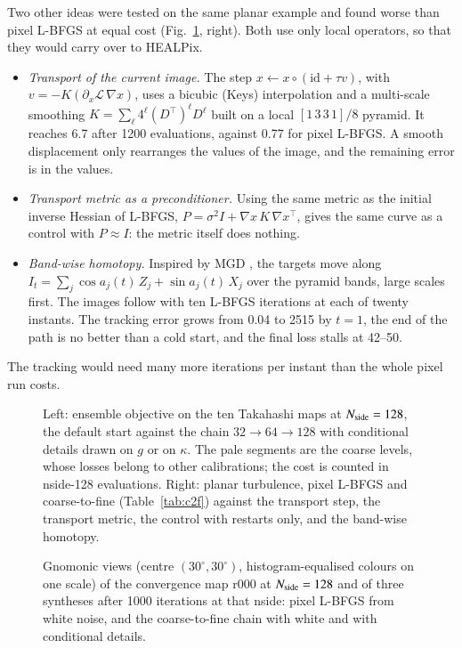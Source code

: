 Two other ideas were tested on the same planar example and found worse than pixel L-BFGS at equal cost (Fig.~\ref{fig:c2f_tests}, right). Both use only local operators, so that they would carry over to HEALPix.
\begin{itemize}
\item \emph{Transport of the current image.} The step $x\leftarrow x\circ(\mathrm{id}+\tau v)$, with $v=-K(\partial_x\mathcal{L}\,\nabla x)$, uses a bicubic (Keys) interpolation and a multi-scale smoothing $K=\sum_\ell 4^\ell (D^\top)^\ell D^\ell$ built on a local $[1\,3\,3\,1]/8$ pyramid. It reaches 6.7 after 1200 evaluations, against 0.77 for pixel L-BFGS. A smooth displacement only rearranges the values of the image, and the remaining error is in the values.
\item \emph{Transport metric as a preconditioner.} Using the same metric as the initial inverse Hessian of L-BFGS, $P=\sigma^2 I+\nabla x\,K\,\nabla x^\top$, gives the same curve as a control with $P\approx I$: the metric itself does nothing.
\item \emph{Band-wise homotopy.} Inspired by MGD \citep{lempereur2026}, the targets move along $I_t=\sum_j \cos a_j(t)\,Z_j+\sin a_j(t)\,X_j$ over the pyramid bands, large scales first. The images follow with ten L-BFGS iterations at each of twenty instants. The tracking error grows from 0.04 to 2515 by $t=1$, the end of the path is no better than a cold start, and the final loss stalls at 42--50.
\end{itemize}
The tracking would need many more iterations per instant than the whole pixel run costs.

\begin{figure}
\centering
{}
\caption{Left: ensemble objective on the ten Takahashi maps at $N_{\rm side}=128$, the default start against the chain $32\to64\to128$ with conditional details drawn on $g$ or on $\kappa$. The pale segments are the coarse levels, whose losses belong to other calibrations; the cost is counted in nside-128 evaluations. Right: planar turbulence, pixel L-BFGS and coarse-to-fine (Table~\ref{tab:c2f}) against the transport step, the transport metric, the control with restarts only, and the band-wise homotopy.}
\label{fig:c2f_tests}
\end{figure}


\begin{figure}
\centering
{}
\caption{Gnomonic views (centre $(30^\circ, 30^\circ)$, histogram-equalised colours on one scale) of the convergence map r000 at $N_{\rm side}=128$ and of three syntheses after 1000 iterations at that nside: pixel L-BFGS from white noise, and the coarse-to-fine chain with white and with conditional details.}
\label{fig:c2f_kappa}
\end{figure}

